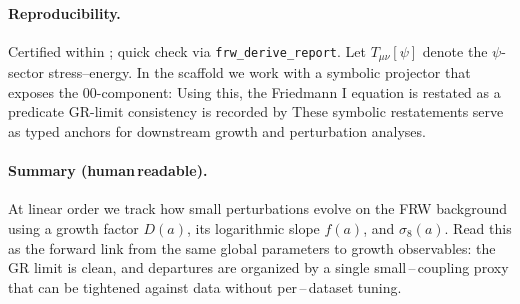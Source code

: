 \documentclass[aps,prd,twocolumn,superscriptaddress,nofootinbib,floatfix,longbibliography]{revtex4-2}
\newcommand{\lean}[1]{\texttt{\detokenize{#1}}}
\begin{document}
\paragraph*{Reproducibility.}
Certified within \lean{FRWDeriveCert}; quick check via \texttt{frw\_derive\_report}.
Let $T_{\mu\nu}[\psi]$ denote the $\psi$-sector stress--energy. In the scaffold we work with a symbolic projector that exposes the $00$-component:
Using this, the Friedmann I equation is restated as a predicate
GR-limit consistency is recorded by
These symbolic restatements serve as typed anchors for downstream growth and perturbation analyses.
%
\paragraph*{Summary (human\,readable).}
At linear order we track how small perturbations evolve on the FRW background using a growth factor $D(a)$, its logarithmic slope $f(a)$, and $\sigma_8(a)$. Read this as the forward link from the same global parameters to growth observables: the GR limit is clean, and departures are organized by a single small\,–\,coupling proxy that can be tightened against data without per\,–\,dataset tuning.
\end{document}
